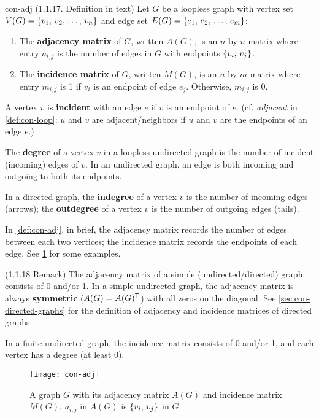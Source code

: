 \documentclass[../src/handouts/main.tex]{subfiles}
\begin{document}
\begin{definition}{}{con-adj}
  (1.1.17. Definition in text)
  Let $G$ be a loopless graph with vertex set $V(G) = \lbrace v_1,\, v_2,\, \ldots,\, v_n\rbrace$ and edge set $E(G) = \lbrace e_1,\, e_2,\, \ldots,\, e_m\rbrace$:

  \begin{enumerate}
    \item The \textbf{adjacency matrix} of $G$, written $A(G)$, is an $n$-by-$n$ matrix where entry $a_{i,j}$ is the number of edges in $G$ with endpoints $\lbrace v_i,\, v_j\rbrace$.
    \item The \textbf{incidence matrix} of $G$, written $M(G)$, is an $n$-by-$m$ matrix where entry $m_{i,j}$ is 1 if $v_i$ is an endpoint of edge $e_j$. Otherwise, $m_{i,j}$ is 0.
  \end{enumerate}

  A vertex $v$ is \textbf{incident} with an edge $e$ if $v$ is an endpoint of $e$. (cf. \textit{adjacent} in \cref{def:con-loop}: $u$ and $v$ are adjacent/neighbors if $u$ and $v$ are the endpoints of an edge $e$.)

  The \textbf{degree} of a vertex $v$ in a loopless undirected graph is the number of incident (incoming) edges of $v$. In an undirected graph, an edge is both incoming and outgoing to both its endpoints.

  In a directed graph, the \textbf{indegree} of a vertex $v$ is the number of incoming edges (arrows); the \textbf{outdegree} of a vertex $v$ is the number of outgoing edges (tails).
\end{definition}

In \cref{def:con-adj}, in brief, the adjacency matrix records the number of edges between each two vertices; the incidence matrix records the endpoints of each edge. See \cref{fig:con-adj} for some examples.

(1.1.18 Remark) The adjacency matrix of a simple (undirected/directed) graph consists of 0 and/or 1. In a simple undirected graph, the adjacency matrix is always \textbf{symmetric} ($A(G) = A(G)^{\mathsf{T}}$) with all zeros on the diagonal. See \cref{sec:con-directed-graphs} for the definition of adjacency and incidence matrices of directed graphs.

In a finite undirected graph, the incidence matrix consists of 0 and/or 1, and each vertex has a degree (at least 0).

\begin{figure}[htbp]
  \centering
  \texttt{[image: con-adj]}
  \caption{A graph $G$ with its adjacency matrix $A(G)$ and incidence matrix $M(G)$. $a_{i,j}$ in $A(G)$ is $\lbrace v_i,\, v_j\rbrace$ in $G$.}
  \label{fig:con-adj}
\end{figure}
\end{document}
